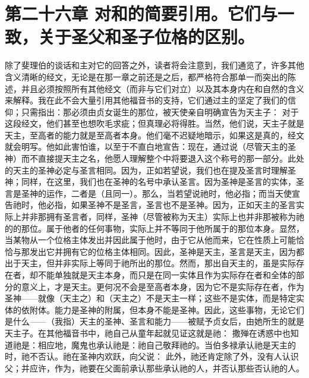 
\section{第二十六章 对和的简要引用。它们与一致，关于圣父和圣子位格的区别。}

除了斐理伯的谈话和主对它的回答之外，读者将会注意到，我们通览了，许多其他含义清晰的经文，无论是在那一章之前还是之后，都严格符合那单一而突出的陈述，并且必须按照所有其他经文（而非与它们对立）以及其本身内在和自然的含义来解释。我在此不会大量引用其他福音书的支持，它们通过主的坚定了我们的信仰；只需指出：那必须由贞女诞生的那位，被天使亲自明确宣告为天主子： 对于这段经文，他们甚至也想吹毛求疵；但真理必将得胜。当然，他们说，天主子就是天主，至高者的能力就是至高者本身。他们毫不迟疑地暗示，如果这是真的，经文就会明写。他如此害怕谁，以至于不直白地宣告：现在，通过说（尽管天主的圣神）而不直接提天主之名，他愿人理解整个中将要退入这个称号的那一部分。此处的天主的圣神必定与圣言相同。因为，正如若望说，我们也在提及圣言时理解圣神；同样，在这里，我们也在圣神的名号中承认圣言。因为圣神是圣言的实体，圣言是圣神的运作，二者是（且同一）。那么，当若望说祂时，他必指；而当天使宣告祂时，他必指，如果圣神不是圣言，圣言也不是圣神。因为，正如天主的圣言实际上并非那拥有圣言者，同样，圣神（尽管被称为天主）实际上也并非那被称为祂的的那位。属于他者的任何事物，实际上并不等同于他所属于的那位本身。显然，当某物从一个位格主体发出并因此属于他时，由于它从他而来，它在性质上可能恰恰与那发出它并拥有它的位格主体相同。因此，圣神是天主，圣言是天主，因为都出于天主，但并非实际上等同于祂所出的那位。然而，那出自天主的，虽是实际存在者，却不能单独就是天主本身，而只是在同一实体且作为实际存在者和全体的部分的意义上，才是天主。更何况不会是至高者本身，因为它不是实际存在者，作为圣神——就像（天主之）和（天主之）不是天主一样；这些不是实体，而是特定实体的依附体。能力是圣神的附属，但本身不能是圣神。因此，这些事物，无论它们是什么——（我指）天主的圣神、圣言和能力——被赋予贞女后，由她所生的就是天主子。在其他福音书中，祂自己从童年起就见证这就是祂： 撒殚在诱惑中也知道祂是：相应地，魔鬼也承认祂是：祂自己敬拜祂的。当伯多禄承认祂是天主的时，祂不否认。祂在圣神内欢跃，向父说： 此外，祂还肯定除了外，没有人认识父；并应许，作为，祂要在父面前承认那些承认祂的人，并否认那些否认祂的人。 